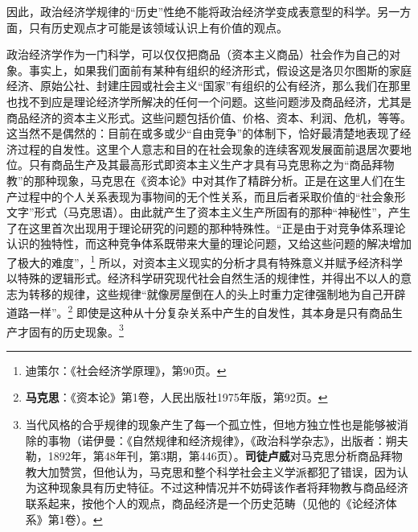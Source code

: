 \documentclass[fontset=fandol, a4paper, 12pt, openright]{ctexbook}
\begin{document}
因此，政治经济学规律的“历史”性绝不能将政治经济学变成表意型的科学。另一方面，只有历史观点才可能是该领域认识上有价值的观点。

政治经济学作为一门科学，可以仅仅把商品（资本主义商品）社会作为自己的对象。事实上，如果我们面前有某种有组织的经济形式，假设这是洛贝尔图斯的家庭经济、原始公社、封建庄园或社会主义“国家”有组织的公有经济，那么我们在那里也找不到应是理论经济学所解决的任何一个问题。这些问题涉及商品经济，尤其是商品经济的资本主义形式。这些问题包括价值、价格、资本、利润、危机，等等。这当然不是偶然的：目前在或多或少“自由竞争”的体制下，恰好最清楚地表现了经济过程的自发性。这里个人意志和目的在社会现象的连续客观发展面前退居次要地位。只有商品生产及其最高形式即资本主义生产才具有马克思称之为“商品拜物教”的那种现象，马克思在《资本论》中对其作了精辟分析。正是在这里人们在生产过程中的个人关系表现为事物间的无个性关系，而且后者采取价值的“社会象形文字”形式（马克思语）。由此就产生了资本主义生产所固有的那种“神秘性”，产生了在这里首次出现用于理论研究的问题的那种特殊性。“正是由于对竞争体系理论认识的独特性，而这种竞争体系既带来大量的理论问题，又给这些问题的解决增加了极大的难度”，\footnote{迪策尔：《社会经济学原理》，第90页。} 所以，对资本主义现实的分析才具有特殊意义并赋予经济科学以特殊的逻辑形式。经济科学研究现代社会自然生活的规律性，并得出不以人的意志为转移的规律，这些规律“就像房屋倒在人的头上时重力定律强制地为自己开辟道路一样”。\footnote{\textbf{马克思}：《资本论》第1卷，人民出版社1975年版，第92页。} 即使是这种从十分复杂关系中产生的自发性，其本身是只有商品生产才固有的历史现象。\footnote{当代风格的合乎规律的现象产生了每一个孤立性，但地方独立性也是能够被消除的事物（诺伊曼：《自然规律和经济规律》，《政治科学杂志》，出版者：朔夫勒，1892年，第48年刊，第3期，第446页）。\textbf{司徒卢威}对马克思分析商品拜物教大加赞赏，但他认为，马克思和整个科学社会主义学派都犯了错误，因为认为这种现象具有历史特征。不过这种情况并不妨碍该作者将拜物教与商品经济联系起来，按他个人的观点，商品经济是一个历史范畴（见他的《论经济体系》第1卷）。} 
\end{document}
